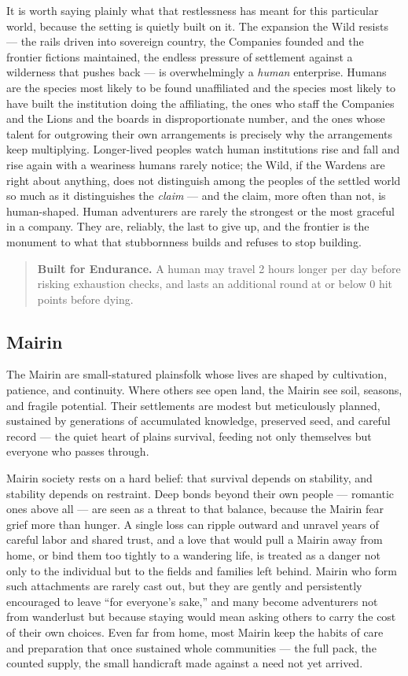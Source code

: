 It is worth saying plainly what that restlessness has meant for this particular world, because the setting is quietly built on it. The expansion the Wild resists --- the rails driven into sovereign country, the Companies founded and the frontier fictions maintained, the endless pressure of settlement against a wilderness that pushes back --- is overwhelmingly a \textit{human} enterprise. Humans are the species most likely to be found unaffiliated and the species most likely to have built the institution doing the affiliating, the ones who staff the Companies and the Lions and the boards in disproportionate number, and the ones whose talent for outgrowing their own arrangements is precisely why the arrangements keep multiplying. Longer-lived peoples watch human institutions rise and fall and rise again with a weariness humans rarely notice; the Wild, if the Wardens are right about anything, does not distinguish among the peoples of the settled world so much as it distinguishes the \textit{claim} --- and the claim, more often than not, is human-shaped. Human adventurers are rarely the strongest or the most graceful in a company. They are, reliably, the last to give up, and the frontier is the monument to what that stubbornness builds and refuses to stop building.

\begin{quote}
\textbf{Built for Endurance.} A human may travel 2 hours longer per day before risking exhaustion checks, and lasts an additional round at or below 0 hit points before dying.
\end{quote}

\subsection{Mairin}

The Mairin are small-statured plainsfolk whose lives are shaped by cultivation, patience, and continuity. Where others see open land, the Mairin see soil, seasons, and fragile potential. Their settlements are modest but meticulously planned, sustained by generations of accumulated knowledge, preserved seed, and careful record --- the quiet heart of plains survival, feeding not only themselves but everyone who passes through.

Mairin society rests on a hard belief: that survival depends on stability, and stability depends on restraint. Deep bonds beyond their own people --- romantic ones above all --- are seen as a threat to that balance, because the Mairin fear grief more than hunger. A single loss can ripple outward and unravel years of careful labor and shared trust, and a love that would pull a Mairin away from home, or bind them too tightly to a wandering life, is treated as a danger not only to the individual but to the fields and families left behind. Mairin who form such attachments are rarely cast out, but they are gently and persistently encouraged to leave ``for everyone's sake,'' and many become adventurers not from wanderlust but because staying would mean asking others to carry the cost of their own choices. Even far from home, most Mairin keep the habits of care and preparation that once sustained whole communities --- the full pack, the counted supply, the small handicraft made against a need not yet arrived.

